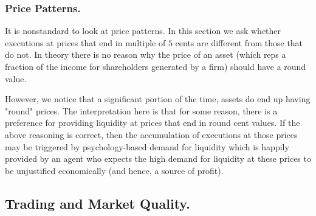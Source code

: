 \documentclass[11pt,a4paper]{article}
\theoremstyle{definition}
\theoremstyle{plain}
\theoremstyle{remark}
\newcommand{\1}{\mathbbm{1}}
\begin{document}
\subsubsection{Price Patterns.} 
It is nonstandard to look at price patterns. In this section we ask whether executions at prices that end in multiple of $5$ cents are different from those that 
do not. In theory there is no reason why the price of an asset (which reps a fraction of the income for shareholders generated by a firm) should have a round value. 

However, we notice that a significant portion of the time, assets do end up having "round" prices. The interpretation here is that for some reason, there is a preference 
for providing liquidity at prices that end in round cent values. 
If the above reasoning is correct, then the accumulation of executions at those prices may be triggered by psychology-based demand for liquidity 
which is happily provided by an agent who expects the high demand for liquidity at these prices to be unjustified economically (and hence, a source of profit). 

\subsection{Trading and Market Quality.} 
\end{document}
